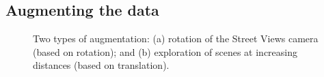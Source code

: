 \subsection{Augmenting the data}
\begin{figure}[t!]
    \centering
    \caption{Two types of augmentation: (a) rotation of the Street Views camera (based on rotation); and (b) exploration of scenes at increasing distances (based on translation).}
\end{figure}
